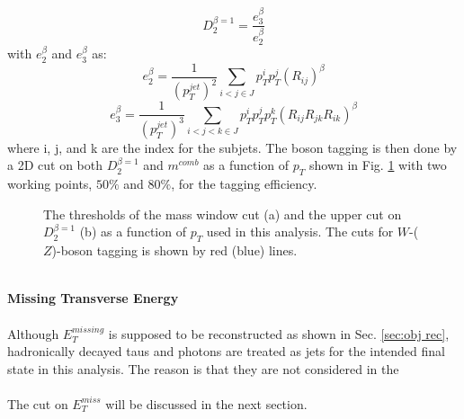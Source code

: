 \begin{equation}
D^{\beta =1}_{2} = \frac{e^{\beta}_{3}}{e^{\beta}_2} 
\end{equation}
with $e^{\beta}_{2}$ and $e^{\beta}_{3}$ as:
\begin{equation}
e^{\beta}_{2} = \frac{1}{(p_{T}^{jet})^2}\displaystyle\sum\limits_{i<j\in J}p_{T}^{i}p_{T}^j(R_{ij})^{\beta}
\end{equation}
\begin{equation}
e^{\beta}_{3} = \frac{1}{(p_{T}^{jet})^3}\displaystyle\sum\limits_{i<j<k\in J}p_{T}^{i}p_{T}^{j}p_{T}^{k}(R_{ij}R_{jk}R_{ik})^{\beta}
\end{equation}
where i, j, and k are the index for the subjets. The boson tagging is then done by a 2D cut on both $D^{\beta =1}_{2}$ and $m^{comb}$ as a function of $p_{T}$ shown in Fig. \ref{Fig:newWZtaggerWP} with two working points, $50\%$ and $80\%$, for the tagging efficiency. 
\begin{figure}[ht]
	\begin{center}
		\caption{The thresholds of the mass window cut (a) and the upper cut on $D^{\beta =1}_2$ (b) as a function of $p_{T}$ used in this analysis. The cuts  for $W$-($Z$)-boson tagging is shown by red (blue) lines.}
		\label{Fig:newWZtaggerWP}
	\end{center}
\end{figure}
\noindent
\\{\bf Missing Transverse Energy}
\\
\\Although $E^{missing}_{T}$ is supposed to be reconstructed as shown in Sec. \ref{sec:obj rec}, hadronically decayed taus and photons are treated as jets for the intended final state in this analysis. The reason is that they are not considered in the 
\\
\\The cut on $E^{miss}_{T}$ will be discussed in the next section.   
